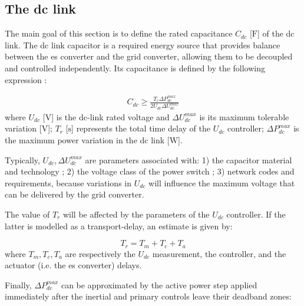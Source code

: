 \documentclass[utf8]{frontiersSCNS} %
\begin{document}

\subsection{The dc link}\label{sec:dc-link}

The main goal of this section is to define the rated capacitance $C_{dc}$ [$\si{\farad}$] of the dc link. The dc link capacitor is a required energy source that provides balance between the \gls{es} converter and the grid converter, allowing them to be decoupled and controlled independently. Its capacitance is defined by the following expression \citep{malesaniACDCAC1995}:

\begin{align}\label{eq:dc-link-c}
    C_{dc} \ge \frac{T_r \Delta P_{dc}^{max}}{2 U_{dc} \Delta U_{dc}^{max} }
\end{align}
where $U_{dc}$ [$\si{\volt}$] is the dc-link rated voltage and $ \Delta U_{dc}^{max}$ is its maximum tolerable variation [$\si{\volt}$]; $T_r$ [$\si{\second}$] represents the total time delay of the $U_{dc}$ controller; $ \Delta P_{dc}^{max}$ is the maximum power variation in the dc link [$\si{\watt}$].

Typically, $U_{dc}, \Delta U_{dc}^{max}$ are parameters associated with: 1) the capacitor material and technology \citep{sarjeantCapacitiveComponentsPower2001}; 2) the voltage class of the power switch \citep{infineontechnologiesPowerSensingSelection2020}; 3) network codes and requirements, because variations in $U_{dc}$ will influence the maximum voltage that can be delivered by the grid converter.

The value of $T_r$ will be affected by the parameters of the $U_{dc}$ controller. If the latter is modelled as a transport-delay, an estimate is given by: 

\begin{equation}
    T_r = T_m + T_c + T_a
\end{equation}
where $T_m, T_c, T_a$ are respectively the $U_{dc}$ measurement, the controller, and the actuator (i.e. the \gls{es} converter) delays.  

Finally, $ \Delta P_{dc}^{max}$ can be approximated by the active power step applied immediately after the inertial and primary controls leave their deadband zones:
\end{document}
